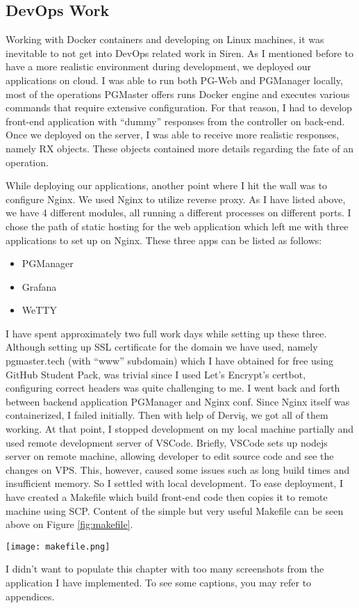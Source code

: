 \subsection{DevOps Work}
Working with Docker containers and developing on Linux machines, it was 
inevitable to not get into DevOps related work in Siren. As I mentioned before 
to have a more realistic environment during development, we deployed our 
applications on cloud. I was able to run both PG-Web and PGManager locally, 
most of the operations PGMaster offers runs Docker engine and executes 
various commands that require extensive configuration. For that reason, I 
had to develop front-end application with ``dummy'' responses from the 
controller on back-end. Once we deployed on the server, I was able to receive 
more realistic responses, namely RX objects. These objects contained more 
details regarding the fate of an operation.
\par
While deploying our applications, another point where I hit the wall was 
to configure Nginx. We used Nginx to utilize reverse proxy. As I have listed 
above, we have 4 different modules, all running a different processes on 
different ports. I chose the path of static hosting for the web application 
which left me with three applications to set up on Nginx. These three apps 
can be listed as follows:
\begin{itemize}
    \item PGManager
    \item Grafana
    \item WeTTY
\end{itemize}
I have spent approximately two full work days while setting up these three. 
Although setting up SSL certificate for the domain we have used, namely 
pgmaster.tech (with ``www'' subdomain) which I have obtained for free using 
GitHub Student Pack, was trivial since I used Let's Encrypt's certbot, 
configuring correct headers was quite challenging to me. I went back and 
forth between backend application PGManager and Nginx conf. Since Nginx itself 
was containerized, I failed initially. Then with help of Derviş, we got all 
of them working. At that point, I stopped development on my local machine 
partially and used remote development server of VSCode. Briefly, VSCode sets 
up nodejs server on remote machine, allowing developer to edit source code 
and see the changes on VPS. This, however, caused some issues such as long 
build times and insufficient memory. So I settled with local development. 
To ease deployment, I have created a Makefile which build front-end code 
then copies it to remote machine using SCP. Content of the simple but very 
useful Makefile can be seen above on Figure \ref{fig:makefile}.
\begin{figure*}[t!]
    \centering
    \texttt{[image: makefile.png]}
    \caption{Life saver of post-deployment development.}
    \label{fig:makefile}
\end{figure*}
I didn't want to populate this chapter with too many screenshots from the 
application I have implemented. To see some captions, you may refer to 
appendices.

